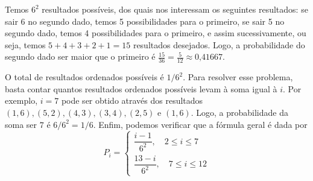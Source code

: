 \begin{questions}
\begin{solution}
\end{solution}

\setcounter{question}{22}
\begin{solution}
Temos $6^2$ resultados possíveis, dos quais nos interessam os seguintes resultados: se sair 6 no segundo dado, temos 5 possibilidades para o primeiro, se sair 5 no segundo dado, temos 4 possibilidades para o primeiro, e assim sucessivamente, ou seja, temos $5+4+3+2+1 = 15$ resultados desejados. Logo, a probabilidade do segundo dado ser maior que o primeiro é $\frac{15}{36} = \frac{5}{12} \approx \text{0,41667}$.
\end{solution}

\begin{solution}
O total de resultados ordenados possíveis é $1/6^2$. Para resolver esse problema, basta contar quantos resultados ordenados possíveis levam à soma igual à $i$. Por exemplo, $i=7$ pode ser obtido através dos resultados $(1,6),(5,2),(4,3),(3,4),(2,5)$ e $(1,6)$. Logo, a probabilidade da soma ser $7$ é $6/6^2 = 1/6$. Enfim, podemos verificar que a fórmula geral é dada por 
	\[P_i = \begin{cases}
		 \dfrac{i-1}{6^2}, \quad 2\leq i\leq 7\\[3mm]
         \dfrac{13-i}{6^2}, \quad 7\leq i\leq 12
	\end{cases}\]
\end{solution}


\end{questions}
